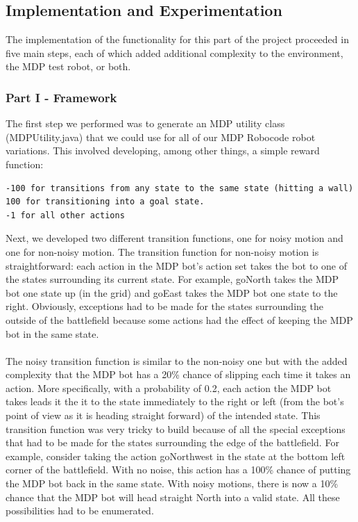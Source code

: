 \documentclass{aiaa-tc}%
\begin{document}
\subsection{Implementation and Experimentation}
The implementation of the functionality for this part of the project proceeded in five main steps, each of which added additional complexity to the environment, the MDP test robot, or both. 
\subsubsection{Part I - Framework}
The first step we performed was to generate an MDP utility class (MDPUtility.java) that we could use for all of our MDP Robocode robot variations.
This involved developing, among other things, a simple reward function:
\begin{verbatim}
-100 for transitions from any state to the same state (hitting a wall)
100 for transitioning into a goal state.
-1 for all other actions	
\end{verbatim}
Next, we developed two different transition functions, one for noisy motion and one for non-noisy motion. The transition function for non-noisy motion is straightforward: each action in the MDP bot's action set takes the bot to one of the states surrounding its current state. For example, goNorth takes the MDP bot one state up (in the grid) and goEast takes the MDP bot one state to the right. Obviously, exceptions had to be made for the states surrounding the outside of the battlefield because some actions had the effect of keeping the MDP bot in the same state. \\ \\
The noisy transition function is similar to the non-noisy one but with the added complexity that the MDP bot has a 20\% chance of slipping each
time it takes an action.
More specifically, with a probability of 0.2, each action the MDP bot takes leads it the it to the state immediately to the right or left (from the bot's point of view as it is heading straight forward) of the intended state. This transition function was very tricky to build because of all the special exceptions that had to be made for the states surrounding the edge of the battlefield. For example, consider taking the action goNorthwest in the state at the bottom left corner of the battlefield. With no noise, this action has a 100\% chance of putting the MDP bot back in the same state. With noisy motions, there is now a 10\% chance that the MDP bot will head straight North into a valid state. All these possibilities had to be enumerated. \\ \\
\end{document}
